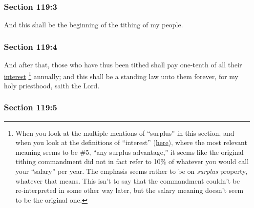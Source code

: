 	\subsubsection{Section 119:3} %
		\label{DC119-3}

		And this shall be the beginning of the tithing of my people.


	\subsubsection{Section 119:4} %
		\label{DC119-4}

		And after that, those who have thus been tithed shall pay one-tenth of all their \hyperref[INTEREST]{interest}%
			\footnote{%
				When you look at the multiple mentions of ``surplus'' in this section, and when you look at the definitions of ``interest'' (\hyperref[INTEREST]{here}), where the most relevant meaning seems to be \#5, ``any surplus advantage,'' it seems like the original tithing commandment did not in fact refer to 10\% of whatever you would call your ``salary'' per year. The emphasis seems rather to be on \textit{surplus} property, whatever that means. This isn't to say that the commandment couldn't be re-interpreted in some other way later, but the salary meaning doesn't seem to be the original one.
				}
		annually; and this shall be a standing law unto them forever, for my holy priesthood, saith the Lord.


	\subsubsection{Section 119:5} %
		\label{DC119-5}

